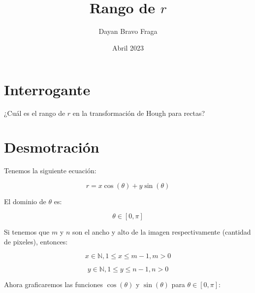 \documentclass[11pt]{article}
\title{Rango de $r$}
\author{Dayan Bravo Fraga}
\date{Abril 2023}
\begin{document}
    \maketitle


    \section{Interrogante}\label{sec:question_mark}

    ¿Cuál es el rango de $r$ en la transformación de Hough para rectas?


    \section{Desmotración}\label{sec:demonstration}

    Tenemos la siguiente ecuación:

    \begin{equation}
        \label{eq:1}
        r = x \cos(\theta) + y \sin(\theta)
    \end{equation}

    El dominio de $\theta$ es:

    \begin{equation}
        \label{eq:2}
        \theta \in [0, \pi]
    \end{equation}

    Si tenemos que $m$ y $n$ son el ancho y alto de la imagen respectivamente (cantidad de pixeles), entonces:

    \begin{equation}
        \label{eq:3}
        x \in \mathbb{N}, 1 \leq x \leq m-1, m > 0
    \end{equation}

    \begin{equation}
        \label{eq:4}
        y \in \mathbb{N}, 1 \leq y \leq n-1, n > 0
    \end{equation}

    Ahora graficaremos las funciones $\cos(\theta)$ y $\sin(\theta)$ para $\theta \in [0, \pi]$:
\end{document}
